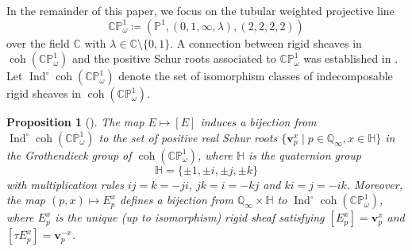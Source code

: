 \documentclass[11pt,a4paper,reqno]{amsart}%
\theoremstyle{plain}
\newtheorem{proposition}[proposition]{Proposition}
\theoremstyle{definition}
\numberwithin{equation}{section}
\numberwithin{equation}{section}
\def\CC{\mathbb{C}}
\def\XX{\mathbb{X}}
\newcommand{\QQi}{\mathbb{Q}_\infty}
\newcommand{\Ext}{\operatorname{Ext}\nolimits}
\newcommand{\Ind}{\operatorname{Ind}\nolimits}
\def\wt{\omega}
\newcommand{\bv}{\mathbf{v}}
\def\coh{\operatorname{coh}}
\def\Ind{\operatorname{Ind}}
\def\Ext{\operatorname{Ext}}
\def\coh{\operatorname{coh}}
\def\CPone{\mathbb{CP}^1_{\wt}}
\newcommand{\bfH}{\mathbb{H}}
\begin{document}
 In the remainder of this paper,  we focus on  the tubular weighted projective line   
 \[\CPone\coloneqq(\mathbb{P}^1,(0,1,\infty,\lambda),(2,2,2,2))\]
  over the   field  $\CC$ with $\lambda\in \CC \setminus\{0,1\}$.
A connection between  rigid sheaves in  $\coh(\CPone)$ and  the positive Schur roots associated to  $\CPone$
 was established in \cite{BG}. 
Let   $\Ind^\circ \coh(\CPone)$  denote the set of isomorphism classes of indecomposable rigid sheaves in $\coh(\CPone)$.
\begin{proposition}[{\cite[Lemma~4.2 and  Proposition~4.3]{BG}}]\label{prop:rigid-to-vectors} 
The map $E\mapsto  [E]$ induces a bijection from  
$\Ind^\circ \coh(\CPone)$ to the set of positive real Schur roots  $\{\bv_p^x \mid p\in\QQi, x \in\bfH\}$ in the Grothendieck group   of $\coh(\CPone)$, where $\bfH$ is  the quaternion group
$$
 \bfH=\{\pm 1,\pm i,\pm j,\pm k\}
$$
with  multiplication rules  $ij=k=-ji$, $jk=i=-kj$ and $ki=j=-ik$.
Moreover, the map $(p,x)\mapsto E_{p}^{x} $  defines a bijection from $\QQi\times \bfH$ to   $\Ind^\circ \coh(\CPone)$, where $E_{p}^{x}$ is the unique (up to isomorphism) rigid sheaf satisfying $  [E^x_p] =\bv_p^x$ and  $  [\tau E^x_p] =\bv_p^{-x}$.
\end{proposition}
\end{document}
